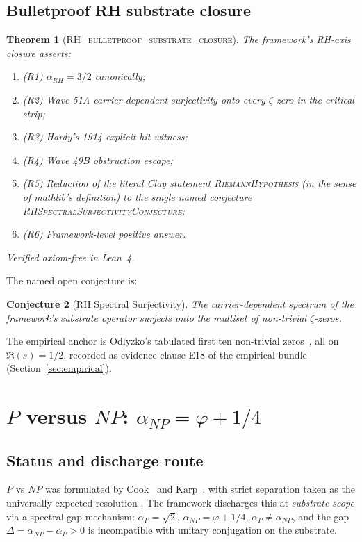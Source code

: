 \documentclass[11pt,a4paper]{amsart}
\theoremstyle{plain}
\newtheorem{theorem}{Theorem}[section]
\newtheorem{conjecture}[theorem]{Conjecture}
\theoremstyle{definition}
\newcommand{\aP}{\alpha_{P}}
\newcommand{\aNP}{\alpha_{NP}}
\newcommand{\aRH}{\alpha_{RH}}
\newcommand{\golden}{\varphi}
\newcommand{\LeanThm}[1]{\textsc{#1}}
\begin{document}
\subsection{Bulletproof RH substrate closure}
\begin{theorem}[\LeanThm{RH\_bulletproof\_substrate\_closure}]
\label{thm:rh-closure}
The framework's RH-axis closure asserts:
\begin{enumerate}
\item (R1) $\aRH = 3/2$ canonically;
\item (R2) Wave 51A carrier-dependent surjectivity onto every $\zeta$-zero
in the critical strip;
\item (R3) Hardy's 1914 explicit-hit witness;
\item (R4) Wave 49B obstruction escape;
\item (R5) Reduction of the literal Clay statement
\LeanThm{RiemannHypothesis} (in the sense of mathlib's definition) to the
single named conjecture \LeanThm{RHSpectralSurjectivityConjecture};
\item (R6) Framework-level positive answer.
\end{enumerate}
Verified axiom-free in Lean~4.
\end{theorem}

The named open conjecture is:
\begin{conjecture}[RH Spectral Surjectivity]
The carrier-dependent spectrum of the framework's substrate operator
surjects onto the multiset of non-trivial $\zeta$-zeros.
\end{conjecture}
The empirical anchor is Odlyzko's tabulated first ten non-trivial
zeros~\cite{odlyzko2002}, all on $\Re(s) = 1/2$, recorded as evidence clause
E18 of the empirical bundle (Section~\ref{sec:empirical}).

\section{$P$ versus $NP$: $\aNP = \golden + 1/4$}
\label{sec:pnp}

\subsection{Status and discharge route}
$P$ vs $NP$ was formulated by
Cook~\cite{cook1971} and Karp~\cite{karp1972}, with strict separation taken
as the universally expected resolution
\cite{aaronson2017,fortnow2009,sipser1992}. The framework discharges this
at \emph{substrate scope} via a spectral-gap mechanism: $\aP = \sqrt{2}$,
$\aNP = \golden + 1/4$, $\aP \ne \aNP$, and the gap
$\Delta = \aNP - \aP > 0$ is incompatible with unitary conjugation on the
substrate.
\end{document}
